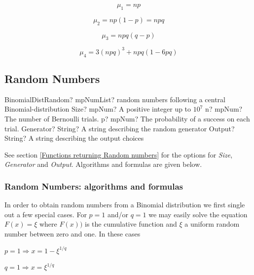 \begin{equation} 
	\mu_1 = np
\end{equation}

\begin{equation} 
	\mu_2 = np(1-p) = npq
\end{equation}

\begin{equation} 
	\mu_3 = npq(q-p)
\end{equation}

\begin{equation} 
	\mu_4 = 3(npq)^3 + npq(1-6pq)
\end{equation}





\subsection{Random Numbers}

\begin{mpFunctionsExtract}
	\mpFunctionFiveNotImplemented
	{BinomialDistRandom? mpNumList? random numbers following a central Binomial-distribution}
	{Size? mpNum? A positive integer up to $10^7$}
	{n? mpNum? The number of Bernoulli trials.}
	{p? mpNum? The probability of a success on each trial.}
	{Generator? String? A string describing the random generator}
	{Output? String? A string describing the output choices}
\end{mpFunctionsExtract}

\vspace{0.3cm}

See section \ref{Functions returning Random numbers} for the options for  {\itshape\sffamily Size},  {\itshape\sffamily Generator} and {\itshape\sffamily Output}. Algorithms and formulas are given below.

\subsubsection{Random Numbers: algorithms and formulas}
In order to obtain random numbers from a Binomial distribution we first single out a few special cases.
For $p = 1$ and/or $q = 1$ we may easily solve the equation $F(x) = \xi$ where $F(x))$ is the cumulative function and $\xi$ a uniform random number between zero and one. In these cases

\begin{center}
	
	$p = 1 \Rightarrow x = 1 - \xi^{1/q}$
	
	$q = 1 \Rightarrow x = \xi^{1/q}$
	
\end{center}


